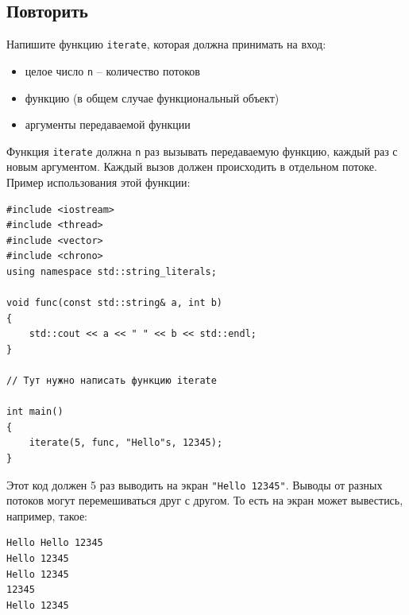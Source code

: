 \documentclass{article}
\begin{document}
\subsection{Повторить}
Напишите функцию \texttt{iterate}, которая должна принимать на вход:
\begin{itemize}
\item целое число \texttt{n} -- количество потоков
\item функцию (в общем случае функциональный объект)
\item аргументы передаваемой функции
\end{itemize}
Функция \texttt{iterate} должна \texttt{n} раз вызывать передаваемую функцию, каждый раз с новым аргументом. Каждый вызов должен происходить в отдельном потоке. Пример использования этой функции:


\begin{lstlisting}
#include <iostream>
#include <thread>
#include <vector>
#include <chrono>
using namespace std::string_literals;

void func(const std::string& a, int b)
{
    std::cout << a << " " << b << std::endl;
}

// Тут нужно написать функцию iterate

int main()
{
    iterate(5, func, "Hello"s, 12345);
}
\end{lstlisting}
Этот код должен 5 раз выводить на экран \texttt{"Hello 12345"}. Выводы от разных потоков могут перемешиваться друг с другом. То есть на экран может вывестись, например, такое:
\begin{verbatim}
Hello Hello 12345
Hello 12345
Hello 12345
12345
Hello 12345
\end{verbatim}
\end{document}
